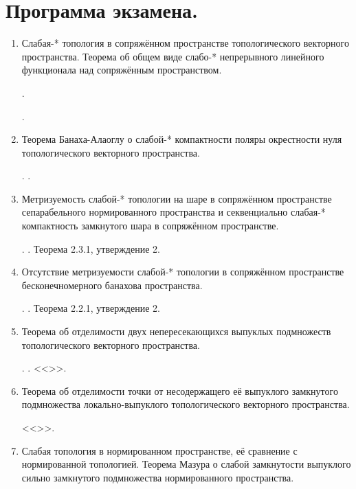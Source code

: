 \section*{Программа экзамена.}
\begin{enumerate}
    \item Слабая-* топология в сопряжённом пространстве топологического векторного пространства. Теорема об общем виде слабо-* непрерывного линейного функционала над сопряжённым пространством.
    
     . 

     .

    \item Теорема Банаха-Алаоглу о слабой-* компактности поляры окрестности нуля топологического векторного пространства.
    
    . .

    \item Метризуемость слабой-* топологии на шаре в сопряжённом пространстве сепарабельного нормированного пространства и секвенциально слабая-* компактность замкнутого шара в сопряжённом пространстве.
    
    . . Теорема 2.3.1, утверждение 2.

    \item Отсутствие метризуемости слабой-* топологии в сопряжённом пространстве бесконечномерного банахова пространства.
    
    . . Теорема 2.2.1, утверждение 2.

    \item Теорема об отделимости двух непересекающихся выпуклых подмножеств топологического векторного пространства.
    
    . .  <<>>.

    \item Теорема об отделимости точки от несодержащего её выпуклого замкнутого подмножества локально-выпуклого топологического векторного пространства.
    
     <<>>.

    \item Слабая топология в нормированном пространстве, её сравнение с нормированной топологией. Теорема Мазура о слабой замкнутости выпуклого сильно замкнутого подмножества нормированного пространства.
    

\end{enumerate}
